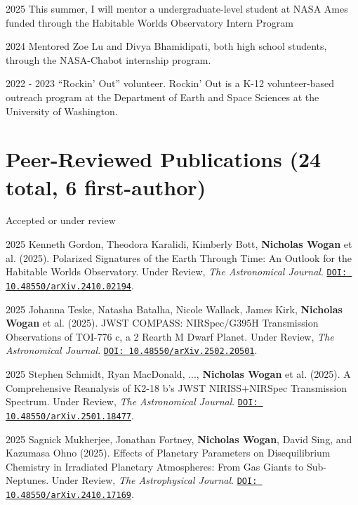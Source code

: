\documentclass[12pt]{article}
\begin{document}
\begin{cvlist}
\item[2025]
  This summer, I will mentor a undergraduate-level student at NASA Ames funded through the Habitable Worlds Observatory Intern Program
\item[2024]
  Mentored Zoe Lu and Divya Bhamidipati, both high school students, through the NASA-Chabot internship program.
\item[2022 - 2023]
  ``Rockin' Out'' volunteer. Rockin' Out is a K-12 volunteer-based outreach program at the Department of Earth and Space Sciences at the University of Washington.
\end{cvlist}

\section{Peer-Reviewed Publications (24 total, 6 first-author)}

\noindent Accepted or under review

\begin{cvlist}
\item[2025]
Kenneth Gordon, Theodora Karalidi, Kimberly Bott, \textbf{Nicholas Wogan} et al. (2025). Polarized Signatures of the Earth Through Time: An Outlook for the Habitable Worlds Observatory. Under Review, \emph{The Astronomical Journal}. \href{https://doi.org/10.48550/arXiv.2410.02194}{\nolinkurl{DOI: 10.48550/arXiv.2410.02194}}.
\item[2025]
  Johanna Teske, Natasha Batalha, Nicole Wallack, James Kirk, \textbf{Nicholas Wogan} et al. (2025). JWST COMPASS: NIRSpec/G395H Transmission Observations of TOI-776 c, a 2 Rearth M Dwarf Planet. Under Review, \emph{The Astronomical Journal}. \href{https://doi.org/10.48550/arXiv.2502.20501}{\nolinkurl{DOI: 10.48550/arXiv.2502.20501}}.
\item[2025]
  Stephen Schmidt, Ryan MacDonald, ..., \textbf{Nicholas Wogan} et al. (2025). A Comprehensive Reanalysis of K2-18 b's JWST NIRISS+NIRSpec Transmission Spectrum. Under Review, \emph{The Astronomical Journal}. \href{https://doi.org/10.48550/arXiv.2501.18477}{\nolinkurl{DOI: 10.48550/arXiv.2501.18477}}.
\item[2025]
  Sagnick Mukherjee, Jonathan Fortney, \textbf{Nicholas Wogan}, David Sing, and Kazumasa Ohno (2025). Effects of Planetary Parameters on Disequilibrium Chemistry in Irradiated Planetary Atmospheres: From Gas Giants to Sub-Neptunes. Under Review, \emph{The Astrophysical Journal}. \href{https://doi.org/10.48550/arXiv.2410.17169}{\nolinkurl{DOI: 10.48550/arXiv.2410.17169}}.
\end{cvlist}
\end{document}
